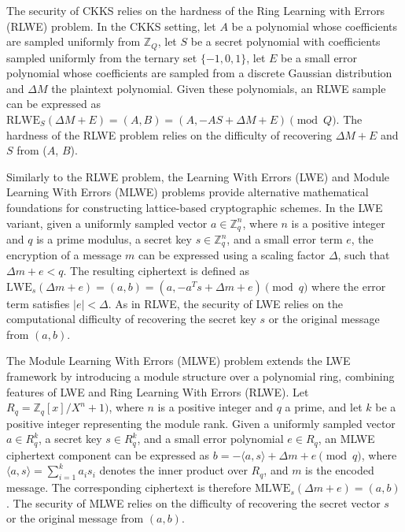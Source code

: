 The security of CKKS relies on the hardness of the Ring Learning with Errors (RLWE) problem. In the CKKS setting, let $A$ be a polynomial whose coefficients are sampled uniformly from $\mathbb{Z}_Q$, let $S$ be a secret polynomial with coefficients sampled uniformly from the ternary set $\{-1,0,1\}$, let $E$ be a small error polynomial whose coefficients are sampled from a discrete Gaussian distribution and $\Delta M$ the plaintext polynomial. Given these polynomials, an RLWE sample can be expressed as $\text{RLWE}_S(\Delta M + E) = (A,B) = \left(A,-AS + \Delta M + E\right) \pmod Q$. The hardness of the RLWE problem relies on the difficulty of recovering $\Delta M + E$ and $S$ from ($A$, $B$).

Similarly to the RLWE problem, the Learning With Errors (LWE) and Module Learning With Errors (MLWE) problems provide alternative mathematical foundations for constructing lattice-based cryptographic schemes. In the LWE variant, given a uniformly sampled vector \(a \in \mathbb{Z}_q^n\), where \(n\) is a positive integer and \(q\) is a prime modulus, a secret key \(s \in \mathbb{Z}_q^n\), and a small error term \(e\), the encryption of a message \(m\) can be expressed using a scaling factor \(\Delta\), such that \(\Delta m + e < q\). The resulting ciphertext is defined as $\text{LWE}_s(\Delta m + e) = (a,b) = \left(a,-a^Ts + \Delta m + e\right) \pmod q$ where the error term satisfies \(|e| < \Delta\). As in RLWE, the security of LWE relies on the computational difficulty of recovering the secret key \(s\) or the original message from $(a, b)$.

The Module Learning With Errors (MLWE) problem extends the LWE framework by introducing a module structure over a polynomial ring, combining features of LWE and Ring Learning With Errors (RLWE). Let \(R_q = \mathbb{Z}_q[x]/X^n+1)\), where $n$ is a positive integer and $q$ a prime, and let \(k\) be a positive integer representing the module rank. Given a uniformly sampled vector \(a \in R_q^k\), a secret key \(s \in R_q^k\), and a small error polynomial \(e \in R_q\), an MLWE ciphertext component can be expressed as $b = -\langle a,s\rangle + \Delta m + e \pmod q$, where \(\langle a,s\rangle = \sum_{i=1}^{k} a_i s_i\) denotes the inner product over \(R_q\), and \(m\) is the encoded message. The corresponding ciphertext is therefore $\text{MLWE}_s(\Delta m + e) = (a,b)$. The security of MLWE relies on the difficulty of recovering the secret vector \(s\) or the original message from $(a, b)$. %

